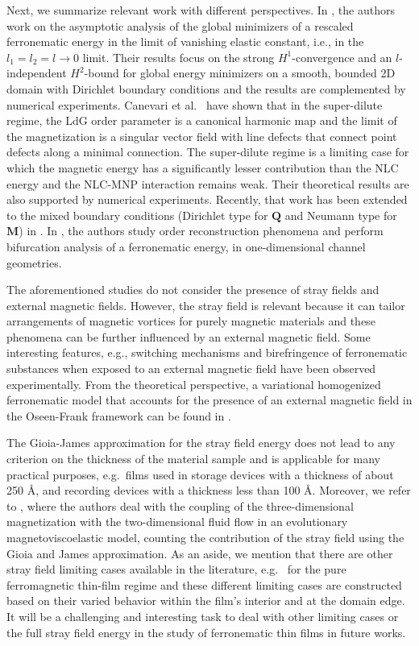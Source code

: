 \documentclass{article}
\def\Qvec{\mathbf{Q}}
\def \Mvec{\mathbf{M}}
\begin{document}
Next, we summarize relevant work with different perspectives. 
In \cite{maity2021parameter}, the authors work on the asymptotic analysis of the global minimizers of a rescaled ferronematic energy in the limit of vanishing elastic constant, i.e., in the $l_1=l_2=l\rightarrow 0$ limit. Their results focus on the strong $H^1$-convergence and an $l$-independent $H^2$-bound for global energy minimizers on a smooth, bounded 2D domain with Dirichlet boundary conditions and the results are complemented by numerical experiments. Canevari et al.~\cite{Canevari} have shown that in the super-dilute regime, the LdG order parameter is a canonical harmonic map and the limit of the magnetization is a singular vector field with line defects that connect point defects along a minimal connection. The super-dilute regime is a limiting case for which the magnetic energy has a significantly lesser contribution than the NLC energy and the NLC-MNP interaction remains weak. Their theoretical results are also supported by numerical experiments. Recently, that work has been extended to the mixed boundary conditions (Dirichlet type for $\Qvec$ and Neumann type for $\Mvec$) in \cite{Canevari2025}. 
In \cite{Dalby}, the authors study order reconstruction phenomena and perform bifurcation analysis of a ferronematic energy, in one-dimensional channel geometries.

The aforementioned studies do not consider the presence of stray fields and external magnetic fields. 
 However, the stray field is relevant because it can tailor arrangements of magnetic vortices for purely magnetic materials \cite{hubert2008magnetic} and these phenomena can be further influenced by an external magnetic field. Some interesting features, e.g., switching mechanisms and birefringence \cite{chen1983observation, Mertelj} of ferronematic substances when exposed to an external magnetic field have been observed experimentally. From the theoretical perspective, a variational homogenized ferronematic model that accounts for the presence of an external magnetic field in the Oseen-Frank framework can be found in \cite{Calderer}. 

The Gioia-James approximation \cite{Giogia} for the stray field energy does not lead to any criterion on the thickness of the material sample and is applicable for many practical purposes, e.g.\ films used in storage devices with a thickness of about 250 \AA, and recording devices with a thickness less than 100 \AA.  Moreover, we refer to \cite{kalousek2021mathematical}, where the authors deal with the coupling of the three-dimensional magnetization with the two-dimensional fluid flow in an evolutionary magnetoviscoelastic model, counting the contribution of the stray field using the Gioia and James approximation. As an aside, we mention that there are other stray field limiting cases available in the literature, e.g.\ \cite{desimone2002reduced, di2023reduced, kohn2005another} for the pure ferromagnetic thin-film regime and these different limiting cases are constructed based on their varied behavior within the film's interior and at the domain edge. It will be a challenging and interesting task to deal with other limiting cases or the full stray field energy in the study of ferronematic thin films in future works.
\end{document}
